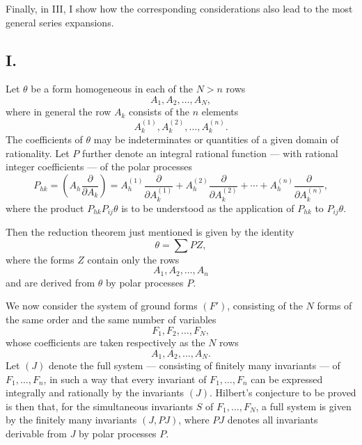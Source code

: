 Finally, in III, I show how the corresponding considerations also lead to the most general series expansions.

\subsection*{I.}
Let $\theta$ be a form homogeneous in each of the $N>n$ rows
\[
  A_1,A_2,\ldots,A_N,
\]
where in general the row $A_k$ consists of the $n$ elements
\[
  A_k^{(1)},A_k^{(2)},\ldots,A_k^{(n)}.
\]
The coefficients of $\theta$ may be indeterminates or quantities of a given domain of rationality. Let $P$ further denote an integral rational function --- with rational integer coefficients --- of the polar processes
\[
  P_{hk}=\left(A_h\frac{\partial}{\partial A_k}\right)
  =A_h^{(1)}\frac{\partial}{\partial A_k^{(1)}}+
   A_h^{(2)}\frac{\partial}{\partial A_k^{(2)}}+
   \cdots+
   A_h^{(n)}\frac{\partial}{\partial A_k^{(n)}},
\]
where the product $P_{hk}P_{ij}\theta$ is to be understood as the application of $P_{hk}$ to $P_{ij}\theta$.

Then the reduction theorem just mentioned is given by the identity
\begin{equation}
  \theta=\sum PZ,
\tag{1}
\end{equation}
where the forms $Z$ contain only the rows
\[
  A_1,A_2,\ldots,A_n
\]
and are derived from $\theta$ by polar processes $P$.

We now consider the system of ground forms $(F')$, consisting of the $N$ forms of the same order and the same number of variables
\[
  F_1,F_2,\ldots,F_N,
\]
whose coefficients are taken respectively as the $N$ rows
\[
  A_1,A_2,\ldots,A_N.
\]
Let $(J)$ denote the full system --- consisting of finitely many invariants --- of $F_1,
\ldots,F_n$, in such a way that every invariant of $F_1,
\ldots,F_n$ can be expressed integrally and rationally by the invariants $(J)$. Hilbert's conjecture to be proved is then that, for the simultaneous invariants $S$ of $F_1,
\ldots,F_N$, a full system is given by the finitely many invariants $(J,PJ)$, where $PJ$ denotes all invariants derivable from $J$ by polar processes $P$.

